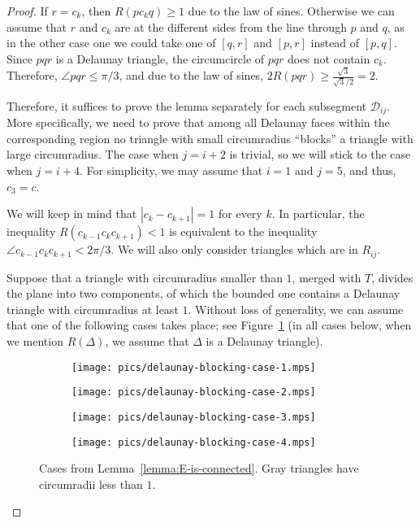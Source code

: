 \begin{appendices}
\begin{proof}
If $r = c_k$, then $R(pc_kq)\geq 1$ due to the law of sines. Otherwise we can assume that $r$ and $c_k$ are at the different sides from the line through $p$ and $q$, as in the other case one we could take one of $[q, r]$ and $[p, r]$ instead of $[p, q]$. Since $pqr$ is a Delaunay triangle, the circumcircle of $pqr$ does not contain $c_k$. Therefore, $\angle pqr\leq\pi/3$, and due to the law of sines, $2R(pqr)\geq \frac{\sqrt{3}}{\sqrt{3}/2} = 2$.

Therefore, it suffices to prove the lemma separately for each subsegment $\mathcal{D}_{ij}$. More specifically, we need to prove that among all Delaunay faces within the corresponding region no triangle with small circumradius ``blocks'' a triangle with large circumradius. The case when $j = i + 2$ is trivial, so we will stick to the case when $j = i + 4$. For simplicity, we may assume that $i = 1$ and $j = 5$, and thus, $c_3 = c$.

We will keep in mind that $|c_k - c_{k+1}| = 1$ for every $k$. In particular, the inequality $R(c_{k-1}c_kc_{k+1}) < 1$ is equivalent to the inequality $\angle c_{k-1}c_kc_{k+1} < 2\pi/3$. We will also only consider triangles which are in $R_{ij}$.

Suppose that a triangle with circumradius smaller than $1$, merged with $T$, divides the plane into two components, of which the bounded one contains a Delaunay triangle with circumradius at least $1$. Without loss of generality, we can assume that one of the following cases takes place; see Figure~\ref{fig:delaunay-blocking-cases} (in all cases below, when we mention $R(\Delta)$, we assume that $\Delta$ is a Delaunay triangle).

\begin{figure}[h!]
    \centering
    \begin{subfigure}[t]{.48\textwidth}
    \texttt{[image: pics/delaunay-blocking-case-1.mps]}
    \end{subfigure}
    \begin{subfigure}[t]{.48\textwidth}
    \texttt{[image: pics/delaunay-blocking-case-2.mps]}
    \end{subfigure}
    \begin{subfigure}[t]{.48\textwidth}
    \texttt{[image: pics/delaunay-blocking-case-3.mps]}
    \end{subfigure}
    \begin{subfigure}[t]{.48\textwidth}
    \texttt{[image: pics/delaunay-blocking-case-4.mps]}
    \end{subfigure}
    \caption{Cases from Lemma~\ref{lemma:E-is-connected}. Gray triangles have circumradii less than $1$.}
    \label{fig:delaunay-blocking-cases}
\end{figure}


\end{proof}
\end{appendices}
